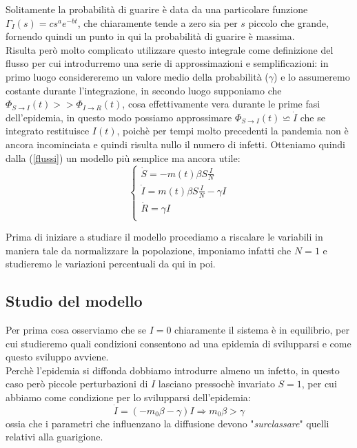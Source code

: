 Solitamente la probabilità di guarire è data da una particolare funzione $\Gamma_I(s)=cs^ae^{-bt}$, che chiaramente tende a zero sia per $s$ piccolo che grande, fornendo quindi un punto in qui la probabilità di guarire è massima.\\ Risulta però molto complicato utilizzare questo integrale come definizione del flusso per cui introdurremo una serie di approssimazioni e semplificazioni: in primo luogo considereremo un valore medio della probabilità ($\gamma$) e lo assumeremo costante durante l'integrazione, in secondo luogo supponiamo che $\Phi_{S\rightarrow I}(t)>>\Phi_{I\rightarrow R}(t)$, cosa effettivamente vera durante le prime fasi dell'epidemia, in questo modo possiamo approssimare $\Phi_{S\rightarrow I}(t)\backsimeq\dot{I}$ che se integrato restituisce $I(t)$, poichè per tempi molto precedenti la pandemia non è ancora incominciata e quindi risulta nullo il numero di infetti. Otteniamo quindi dalla (\ref{flussi}) un modello più semplice ma ancora utile:
\begin{equation}
	\begin{cases}
		\dot{S}=-m(t)\beta S\frac{I}{N}\\
		\dot{I}=m(t)\beta S\frac{I}{N}-\gamma I\\
		\dot{R}=\gamma I\\
	\end{cases}
	\label{SIR}
\end{equation}

Prima di iniziare a studiare il modello procediamo a riscalare le variabili in maniera tale da normalizzare la popolazione, imponiamo infatti che $N=1$ e studieremo le variazioni percentuali da qui in poi.
\subsection{Studio del modello}

Per prima cosa osserviamo che se $I=0$ chiaramente il sistema è in equilibrio, per cui studieremo quali condizioni consentono ad una epidemia di svilupparsi e come questo sviluppo avviene.\\

Perchè l'epidemia si diffonda dobbiamo introdurre almeno un infetto, in questo caso però piccole perturbazioni di $I$ lasciano pressochè invariato $S=1$, per cui abbiamo come condizione per lo svilupparsi dell'epidemia:
\begin{equation}
	\dot{I}=(-m_0\beta-\gamma )I \Rightarrow m_0\beta>\gamma
\end{equation} 
ossia che i parametri che influenzano la diffusione devono "\textit{surclassare}" quelli relativi alla guarigione.\\

